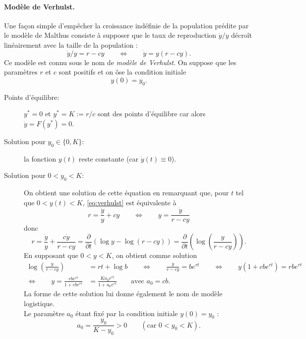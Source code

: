 \paragraph*{Modèle de Verhulst.}
Une façon simple d'empêcher la croissance indéfinie de la population prédite par le modèle de Malthus consiste à supposer que le taux de reproduction $\dot y / y$ décroît linéairement avec la taille de la population : 
\begin{equation} \label{eq:verhulst}
\dot y / y = r - cy
\qquad \Leftrightarrow \qquad
\dot y = y(r - cy).
\end{equation}
Ce modèle est connu sous le nom de {\em modèle de Verhulst}. On suppose que les paramètres $r$ et $c$ sont positifs et on ôse la condition initiale
$$
y(0) = y_0.
$$
\begin{description}
  \item[Points d'équilibre:] $y^* = 0$ et $y^* = K := r/c$ sont des points d'équilibre car alors $\dot y = F(y^*) = 0$.
  \item[Solution pour $y_0 \in \{0, K\}$:] la fonction $y(t)$ reste constante (car $\dot y(t) \equiv 0$).
  \item[Solution pour $0 < y_0 < K$:]  
  On obtient une solution de cette équation en remarquant que, pour $t$ tel que $0 < y(t) < K$, \eqref{eq:verhulst} est équivalente à 
  $$
  r = \frac{\dot y}y + cy \qquad \Leftrightarrow \qquad y = \frac{\dot y}{r - cy}
  $$
  donc
  \begin{equation} \label{eq:verhulstSolution}
  r 
  = \frac{\dot y}{y} + \frac{c \dot y}{r - cy}
  = \frac{\partial}{\partial t} \left(\log y - \log (r - cy) \right)
  = \frac{\partial}{\partial t} \left(\log \left(\frac{y}{r - cy}\right)\right).
  \end{equation}
  En supposant que $0 < y < K$, on obtient comme solution 
  \begin{align*}
    \log \left(\frac{y}{r - cy}\right) & = rt + \log b
    \qquad \Leftrightarrow \qquad 
    \frac{y}{r - cy} = b e^{rt}
    \qquad \Leftrightarrow \qquad
    y(1 + c b e^{rt}) = r b e^{rt} \\
    \Leftrightarrow \qquad 
    y = \frac{rb e^{rt}}{1 + cb e^{rt}} & = \frac{K a_0 e^{rt}}{1 + a_0 e^{rt}}
    \qquad \text{avec } a_0 = cb.
  \end{align*}
  La forme de cette solution lui donne également le nom de modèle logistique. \\
  Le paramètre $a_0$ étant fixé par la condition initiale $y(0) = y_0$ : 
  $$
  a_0 = \frac{y_0}{K-y_0} > 0 \qquad (\text{car } 0  < y_0 < K).
$$
\end{description}
